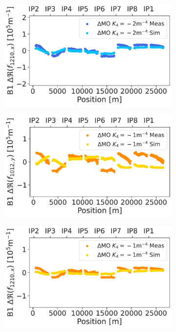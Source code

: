 \begin{figure}[!htb]
\begin{subfigure}{0.47\textwidth}
        \includegraphics[width=\textwidth]{./images/skew_octupoles/responses_coupling/f1210_response_meas_sim_-2_REAL_smoll.pdf}
    \end{subfigure}
    \par\medskip 
    \begin{subfigure}{0.47\textwidth}
        \includegraphics[width=\textwidth]{./images/skew_octupoles/responses_coupling/f1012_response_meas_sim_-1_REAL_smoll.pdf}
    \end{subfigure}
    \hfill
    \begin{subfigure}{0.47\textwidth}
        \includegraphics[width=\textwidth]{./images/skew_octupoles/responses_coupling/f1210_response_meas_sim_-1_REAL_smoll.pdf}

\end{subfigure}
\end{figure}
